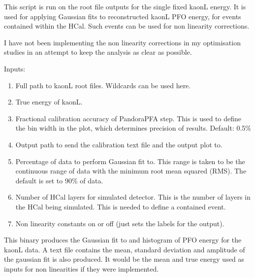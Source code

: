 \documentclass[11pt, oneside]{article}   	%
\begin{document}
This script is run on the root file outputs for the single fixed kaonL energy.  It is used for applying Gaussian fits to reconstructed kaonL PFO energy, for events contained within the HCal.  Such events can be used for non linearity corrections.

I have not been implementing the non linearity corrections in my optimisation studies in an attempt to keep the analysis as clear as possible.  

Inputs:
\begin{enumerate}
\item Full path to kaonL root files.  Wildcards can be used here.
\item True energy of kaonL.
\item Fractional calibration accuracy of PandoraPFA step.  This is used to define the bin width in the plot, which determines precision of results.  Default: 0.5\%
\item Output path to send the calibration text file and the output plot to.
\item Percentage of data to perform Gaussian fit to.  This range is taken to be the continuous range of data with the minimum root mean squared (RMS).  The default is set to 90\% of data.
\item Number of HCal layers for simulated detector.  This is the number of layers in the HCal being simulated.  This is needed to define a contained event.
\item Non linearity constants on or off (just sets the labels for the output).
\end{enumerate}

This binary produces the Gaussian fit to and histogram of PFO energy for the kaonL data.  A text file contains the mean, standard deviation and amplitude of the gaussian fit is also produced.  It would be the mean and true energy used as inputs for non linearities if they were implemented.
\end{document}
